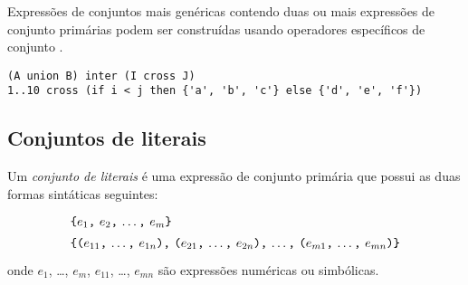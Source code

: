 \documentclass[11pt, brazil]{report}
\def\para#1{\noindent{\bf#1}}
\begin{document}

Expressões de conjuntos mais genéricas contendo duas ou mais expressões
de conjunto primárias podem ser construídas usando operadores
específicos de conjunto .

\para{Exemplos}

%

\begin{verbatim}
(A union B) inter (I cross J)
1..10 cross (if i < j then {'a', 'b', 'c'} else {'d', 'e', 'f'})
\end{verbatim}

\subsection{Conjuntos de literais}

Um {\it conjunto de literais} é uma expressão de conjunto primária
que possui as duas formas \linebreak sintáticas seguintes:
$$
{\def\arraystretch{1.4}
\begin{array}{l}
\mbox{{\tt\{}$e_1${\tt,} $e_2${\tt,} \dots{\tt,} $e_m${\tt\}}}\\
\mbox{{\tt\{(}$e_{11}${\tt,} \dots{\tt,} $e_{1n}${\tt),}
{\tt(}$e_{21}${\tt,} \dots{\tt,} $e_{2n}${\tt),} \dots{\tt,}
{\tt(}$e_{m1}${\tt,} \dots{\tt,} $e_{mn}${\tt)\}}}\\
\end{array}
}
$$
onde $e_1$, \dots, $e_m$, $e_{11}$, \dots, $e_{mn}$ são expressões
numéricas ou simbólicas.
\end{document}

